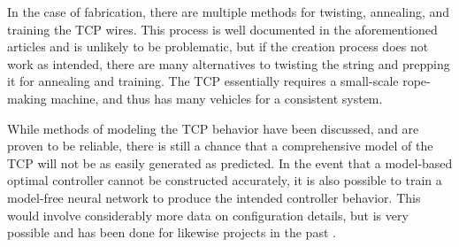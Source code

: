 	In the case of fabrication, there are multiple methods for twisting, annealing, and training the TCP wires. This process is well documented in the aforementioned articles and is unlikely to be problematic, but if the creation process does not work as intended, there are many alternatives to twisting the string and prepping it for annealing and training. The TCP essentially requires a small-scale rope-making machine, and thus has many vehicles for a consistent system.
	
	While methods of modeling the TCP behavior have been discussed, and are proven to be reliable, there is still a chance that a comprehensive model of the TCP will not be as easily generated as predicted. In the event that a model-based optimal controller cannot be constructed accurately, it is also possible to train a model-free neural network to produce the intended controller behavior. This would involve considerably more data on configuration details, but is very possible and has been done for likewise projects in the past \cite{yang_efficient_2000, byravan_se3-nets_2017}.
